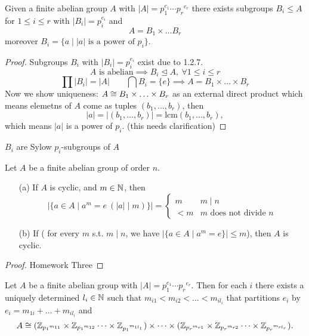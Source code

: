 \documentclass[11pt,leqno,oneside]{amsart}
\newcommand{\normsubgroup}{\mathrel{\unlhd}}
\newcommand{\primedecomposition}[3]{#1_1^{#2_1} \cdots {#1_{#3}}^{#2_{#3}}}
\begin{document}
\begin{cor*}[1.2.8]
  Given a finite abelian group \(A\)
  with
  \(|A|=\primedecomposition{p}{e}{r}\)
  there exists subgroups \(B_i \le A\)
  for \(1 \le i \le r\) with
  \(|B_i|=p_i^{e_i}\) and
  \[A = B_1 \times \ldots B_r\] moreover
  \(B_i = \{a \mid |a| \text{ is a power
    of } p_i\}\).
\end{cor*}

\begin{proof}
  Subgroups \(B_i\) with
  \(|B_i|=p_i^{e_i}\) exist due to
  1.2.7.
  \[A \text{ is abelian} \implies B_i
    \normsubgroup A,\ \forall 1 \le i
    \le r\]
  \[\prod|B_i| = |A| \qquad \bigcap B_i
    = \{e\} \implies A = B_1 \times
    \ldots \times B_r\] Now we show
  uniqueness:
  \(A \mathrel{\cong} B_1 \times \ldots \times
  B_r\) as an external direct product
  which means elemetns of \(A\) come as
  tuples \((b_1,\ldots,b_r)\), then
  \[|a|=|(b_1,\ldots,b_r)|=\text{lcm}(b_1,\ldots,b_r),\]
  which means \(|a|\) is a power of
  \(p_i\). (this needs clarification)
\end{proof}

\begin{rmk*}
  \(B_i\) are Sylow \(p_i\)-subgroups of
  \(A\)
\end{rmk*}

\begin{prop*}[1.2.9]
  Let \(A\) be a finite abelian group of
  order \(n\).
  \begin{enumerate}
  \item[(a)] If \(A\) is cyclic, and
    \(m \in {\mathbb N}\), then
    \[|\{a \in A \mid a^m = e\ (|a| \mid
      m)\}| =
      \begin{cases}
        m   &  m \mid n\\
        <m & m \text{ does not divide }
        n
      \end{cases}
    \]
  \item[(b)] If ( for every $m$ s.t. \(m \mid n\), we have
    \(|\{a \in A \mid a^m = e\}| \le
    m\)), then \(A\) is cyclic.
  \end{enumerate}
\end{prop*}
\begin{proof}
  Homework Three
\end{proof}

\begin{thm*}
  Let \(A\) be a finite abelian group
  with
  \(|A|=\primedecomposition{p}{e}{r}\). Then
  for each \(i\) there exists a uniquely
  determined \(l_i \in {\mathbb N}\) such that
  \(m_{i1} < m_{i2} < \ldots <
  m_{il_i}\) that partitions \(e_i\) by
  \(e_i=m_{1i}+\ldots+m_{il_i}\) and
  \[A \mathrel{\cong} ({\mathbb Z}_{{p_1}^{m_{11}}} \times
    {\mathbb Z}_{{p_1}^{m_{12}}} \cdots \times
    {\mathbb Z}_{{p_1}^{m_{1l_1}}}) \times \cdots
    \times ({\mathbb Z}_{{p_r}^{m_{r1}}} \times
    {\mathbb Z}_{{p_r}^{m_{r2}}} \cdots \times
    {\mathbb Z}_{{p_r}^{m_{rl_r}}}).\]
\end{thm*}
\end{document}
